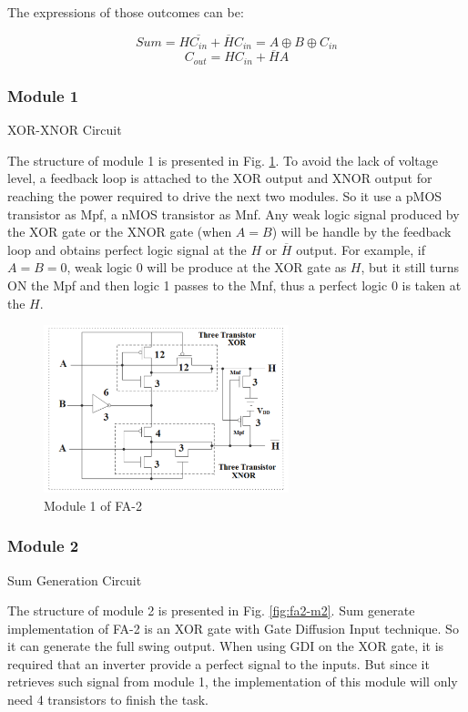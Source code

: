\documentclass[conference]{IEEEtran}
\begin{document}
The expressions of those outcomes can be:

\begin{equation}
	Sum = H\overline{C_{in}} + \overline{H}C_{in} = A \oplus B \oplus C_{in}
\end{equation}
\begin{equation}
	C_{out} = HC_{in} + \overline{H}A
\end{equation}

\subsubsection{Module 1}XOR-XNOR Circuit

The structure of module 1 is presented in Fig. \ref{fig:fa2-m1}.
To avoid the lack of voltage level, a feedback loop is attached to the XOR output and XNOR output
for reaching the power required to drive the next two modules. So it use a pMOS transistor as Mpf, a nMOS transistor as Mnf.
Any weak logic signal produced by the XOR gate or the XNOR gate (when \(A=B\))
will be handle by the feedback loop and obtains perfect logic signal at the \(H\) or $\overline{H}$ output.
For example, if \(A = B = 0\), weak logic 0 will be produce at the XOR gate as \(H\),
but it still turns ON the Mpf and then logic 1 passes to the Mnf, thus a perfect logic 0 is taken at the \(H\).

\begin{figure}[!ht]
	\centering
	\includegraphics[width=2.8in]{fa2-m1.png}
	\caption{Module 1 of FA-2}
	\label{fig:fa2-m1}
\end{figure}

\subsubsection{Module 2} Sum Generation Circuit

The structure of module 2 is presented in Fig. \ref{fig:fa2-m2}.
Sum generate implementation of FA-2 is an XOR gate with Gate Diffusion Input technique.
So it can generate the full swing output.
When using GDI on the XOR gate, it is required that an inverter provide a perfect signal to the inputs.
But since it retrieves such signal from module 1, the implementation of this module will only need 4 transistors to finish the task.
\end{document}
